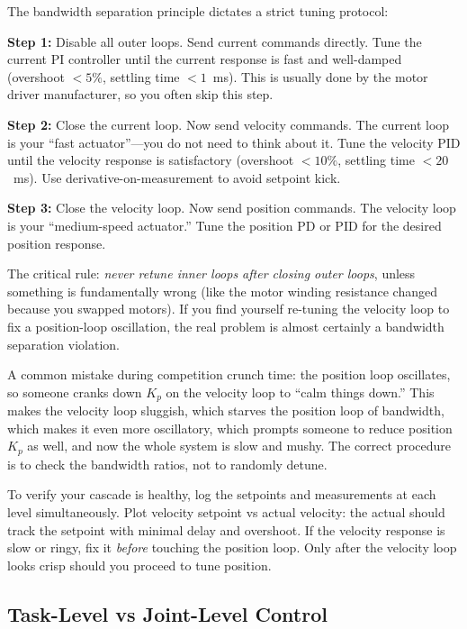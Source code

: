 The bandwidth separation principle dictates a strict tuning protocol:

\textbf{Step 1:} Disable all outer loops. Send current commands directly. Tune the current PI controller until the current response is fast and well-damped (overshoot $<5\%$, settling time $<1$~ms). This is usually done by the motor driver manufacturer, so you often skip this step.

\textbf{Step 2:} Close the current loop. Now send velocity commands. The current loop is your ``fast actuator''---you do not need to think about it. Tune the velocity PID until the velocity response is satisfactory (overshoot $<10\%$, settling time $<20$~ms). Use derivative-on-measurement to avoid setpoint kick.

\textbf{Step 3:} Close the velocity loop. Now send position commands. The velocity loop is your ``medium-speed actuator.'' Tune the position PD or PID for the desired position response.

The critical rule: \textit{never retune inner loops after closing outer loops}, unless something is fundamentally wrong (like the motor winding resistance changed because you swapped motors). If you find yourself re-tuning the velocity loop to fix a position-loop oscillation, the real problem is almost certainly a bandwidth separation violation.

A common mistake during competition crunch time: the position loop oscillates, so someone cranks down $K_p$ on the velocity loop to ``calm things down.'' This makes the velocity loop sluggish, which starves the position loop of bandwidth, which makes it even more oscillatory, which prompts someone to reduce position $K_p$ as well, and now the whole system is slow and mushy. The correct procedure is to check the bandwidth ratios, not to randomly detune.

To verify your cascade is healthy, log the setpoints and measurements at each level simultaneously. Plot velocity setpoint vs actual velocity: the actual should track the setpoint with minimal delay and overshoot. If the velocity response is slow or ringy, fix it \textit{before} touching the position loop. Only after the velocity loop looks crisp should you proceed to tune position.

\subsection{Task-Level vs Joint-Level Control}

